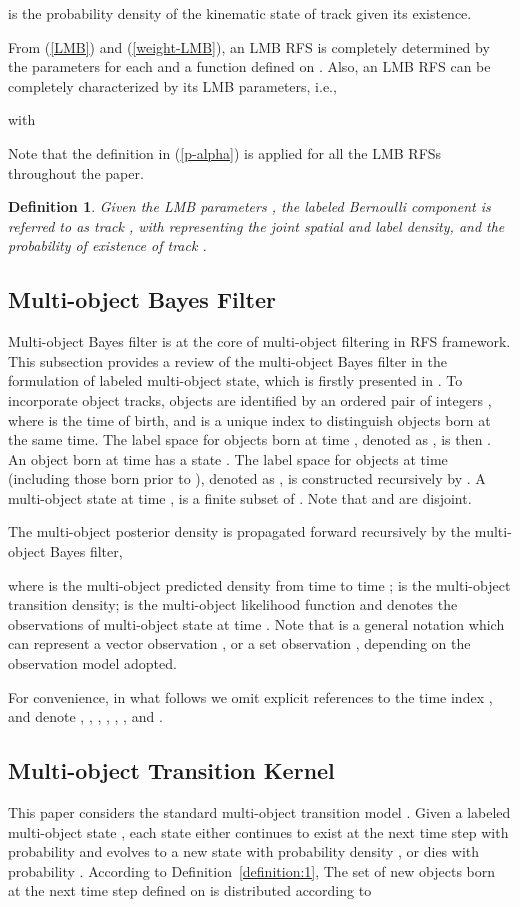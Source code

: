 \documentclass[journal]{IEEEtran}
\newtheorem{Def}{Definition}
\begin{document}
 is the probability density of the kinematic state of track  given its existence. 

From  (\ref{LMB}) and (\ref{weight-LMB}), an LMB RFS is completely determined by the parameters  for each  and a function  defined on . 
Also, an LMB RFS can be completely characterized by its
LMB
parameters, i.e.,

with 

Note that the definition in (\ref{p-alpha}) is applied for all the LMB RFSs throughout the paper.
\begin{Def}\label{definition:2}
Given the 
LMB
parameters , the labeled Bernoulli component  is referred to as  track , with  representing the joint spatial and label density, and    the probability of existence of  track .
\end{Def}


\subsection{Multi-object Bayes Filter}
Multi-object Bayes filter is at the core of multi-object filtering in RFS framework. This subsection provides  a   review of  the multi-object Bayes filter in the formulation of labeled multi-object state, which is firstly presented in \cite{refr:label_1}.  To incorporate object tracks, objects are identified by an ordered pair of integers , where  is the time of birth, and  is
a unique index to distinguish objects born at the same time.
The label space for objects born at time , denoted as , is
then . An object born at time  has  a state .
The label space for objects at time  (including those born
prior to ), denoted as , is constructed recursively by
. A multi-object state  at time , is a
finite subset of . Note that  and  are disjoint.

The multi-object posterior density  is propagated forward recursively by the multi-object Bayes filter,

where  is the  multi-object predicted density from time  to time ;  is the multi-object transition density;  is the multi-object likelihood function and  denotes the observations of multi-object state  at time . Note that  is a general notation which can represent a vector observation , or  a set  observation , depending on the observation model  adopted.

For convenience, in what follows we omit explicit references
to the time index , and denote ,   , , , , , and .
\subsection{Multi-object Transition Kernel}
This paper considers the standard multi-object transition model  \cite{refr:Mahler_book,refr:label_1}. Given a labeled multi-object state , each state  either continues to exist at the next time step with probability  and evolves to a new state  with probability density , or dies with probability . According to Definition~\ref{definition:1}, The  set of new objects born at  the next time step defined on  is distributed according to
\end{document}
